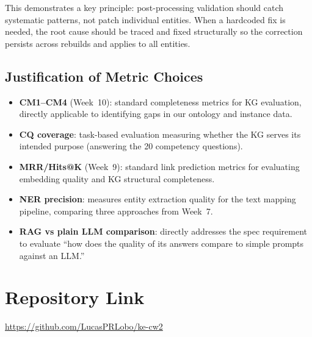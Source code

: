 \documentclass[11pt,a4paper]{article}
\begin{document}
This demonstrates a key principle: post-processing validation should catch systematic patterns, not patch individual entities. When a hardcoded fix is needed, the root cause should be traced and fixed structurally so the correction persists across rebuilds and applies to all entities.

\subsection{Justification of Metric Choices}

\begin{itemize}[nosep]
  \item \textbf{CM1--CM4} (Week~10): standard completeness metrics for KG evaluation, directly applicable to identifying gaps in our ontology and instance data.
  \item \textbf{CQ coverage}: task-based evaluation measuring whether the KG serves its intended purpose (answering the 20 competency questions).
  \item \textbf{MRR/Hits@K} (Week~9): standard link prediction metrics for evaluating embedding quality and KG structural completeness.
  \item \textbf{NER precision}: measures entity extraction quality for the text mapping pipeline, comparing three approaches from Week~7.
  \item \textbf{RAG vs plain LLM comparison}: directly addresses the spec requirement to evaluate ``how does the quality of its answers compare to simple prompts against an LLM.''
\end{itemize}

\section{Repository Link}

\url{https://github.com/LucasPRLobo/ke-cw2}
\end{document}
